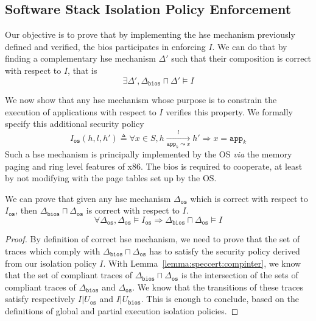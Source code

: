 \subsection{Software Stack Isolation Policy Enforcement}
\label{subsec:speccert2:isolationenforcement}

Our objective is to prove that by implementing the \ac{hse} mechanism previously
defined and verified, the \ac{bios} participates in enforcing \( I \).
%
We can do that by finding a complementary \ac{hse} mechanism \( \Delta' \) such
that their composition is correct with respect to \( I \), that is
%
\[
  \exists \Delta', \Delta_{\mathtt{bios}} \sqcap \Delta' \models I
\]

We now show that any \ac{hse} mechanism whose purpose is to constrain the
execution of applications with respect to \( I \) verifies this property.
%
We formally specify this additional security policy
%
\[
  I_\mathtt{os}(h, l, h') \triangleq \forall x \in S, h
  \xrightarrow[\mathtt{app}_k \leadsto x]{l} h' \Rightarrow x = \mathtt{app}_k
\]
%
Such a \ac{hse} mechanism is principally implemented by the OS \emph{via} the
memory paging and ring level features of x86.
%
The \ac{bios} is required to cooperate, at least by not modifying with the page
tables set up by the OS.

We can prove that given any \ac{hse} mechanism \( \Delta_{\mathtt{os}} \) which
is correct with respect to \( I_{\mathtt{os}} \), then
\( \Delta_{\mathtt{bios}} \sqcap \Delta_{\mathtt{os}} \) is correct with respect
to \( I \).
%
\[
  \forall \Delta_{\mathtt{os}}, \Delta_{\mathtt{os}} \models I_{\mathtt{os}}
  \Rightarrow \Delta_{\mathtt{bios}} \sqcap \Delta_{\mathtt{os}} \models I
\]

\begin{proof}
  By definition of correct \ac{hse} mechanism, we need to prove that the set of
  traces which comply with $\Delta_{\mathtt{bios}} \sqcap \Delta_{\mathtt{os}}$
  has to satisfy the security policy derived from our isolation policy $I$.
  With Lemma~\ref{lemma:speccert:compinter}, we know that the set of compliant
  traces of $\Delta_{\mathtt{bios}} \sqcap \Delta_{\mathtt{os}}$ is the
  intersection of the sets of compliant traces of $\Delta_{\mathtt{bios}}$ and
  $\Delta_{\mathtt{os}}$.
  We know that the transitions of these traces satisfy respectively
  $I|U_{\mathtt{os}}$ and $I|U_{\mathtt{bios}}$.
  This is enough to conclude, based on the definitions of global and partial
  execution isolation policies.
\end{proof}

